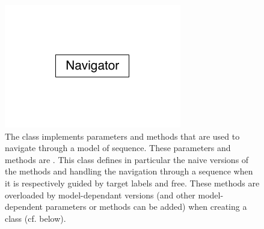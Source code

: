 \documentclass[letterpaper,10pt,english]{sphinxmanual}
\begin{document}
\begin{figure}[htbp]
\centering
\capstart

\includegraphics{inheritance-111a3bc16fdc4ecb7d225978d938cca5aadd22cc.pdf}
\caption{The class {\hyperref[\detokenize{index:Navigator.Navigator}]{}} implements parameters and methods that are used to navigate through a model of sequence. These parameters and methods are . This class defines in particular the naive versions of the methods {\hyperref[\detokenize{index:Navigator.Navigator.simply_guided_generation}]{}} and {\hyperref[\detokenize{index:Navigator.Navigator.free_generation}]{}} handling the navigation through a sequence when it is respectively guided by target labels and free. These methods are overloaded by model-dependant versions (and other model-dependent parameters or methods can be added) when creating a  class (cf. below).}\label{\detokenize{index:id2}}\end{figure}
\end{document}
